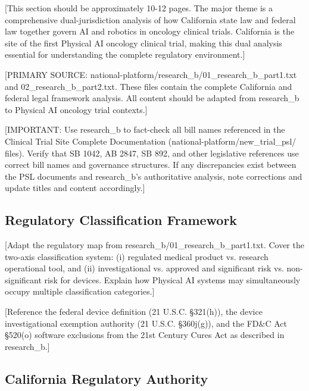 
[This section should be approximately 10-12 pages. The major theme is a
comprehensive dual-jurisdiction analysis of how California state law and
federal law together govern AI and robotics in oncology clinical trials.
California is the site of the first Physical AI oncology clinical trial, making
this dual analysis essential for understanding the complete regulatory
environment.]

[PRIMARY SOURCE: national-platform/research\_b/01\_research\_b\_part1.txt and
02\_research\_b\_part2.txt. These files contain the complete California and
federal legal framework analysis. All content should be adapted from research\_b
to Physical AI oncology trial contexts.]

[IMPORTANT: Use research\_b to fact-check all bill names referenced in the
Clinical Trial Site Complete Documentation \cite{site-docs}
(national-platform/new\_trial\_psl/ files). Verify that SB 1042, AB 2847,
SB 892, and other legislative references use correct bill names and governance
structures. If any discrepancies exist between the PSL documents and
research\_b's authoritative analysis, note corrections and update titles
and content accordingly.]

\subsection{Regulatory Classification Framework}
\label{subsec:regulatory-classification}

[Adapt the regulatory map from research\_b/01\_research\_b\_part1.txt. Cover the
two-axis classification system: (i) regulated medical product vs. research
operational tool, and (ii) investigational vs. approved and significant risk
vs. non-significant risk for devices. Explain how Physical AI systems may
simultaneously occupy multiple classification categories.]

[Reference the federal device definition (21 U.S.C. \S 321(h)), the device
investigational exemption authority (21 U.S.C. \S 360j(g)), and the FD\&C Act
\S 520(o) software exclusions from the 21st Century Cures Act as described in
research\_b.]

\subsection{California Regulatory Authority}
\label{subsec:california-authority}

